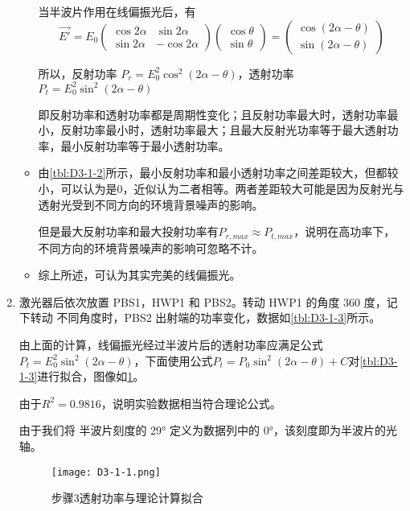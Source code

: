 \documentclass[dvipsnames, svgnames,a4paper,11pt]{article}
\begin{document}
\begin{enumerate}
\begin{itemize}
					当半波片作用在线偏振光后，有
					$$
						\vec{E'} = E_0 
						\begin{pmatrix}
							\cos2\alpha		&\sin2\alpha	\\
						   \sin2\alpha		&-\cos2\alpha
						\end{pmatrix}
						\begin{pmatrix}
							\cos\theta	\\
							\sin\theta
						\end{pmatrix} 
						= 
						\begin{pmatrix}
							\cos(2 \alpha - \theta)		\\
							\sin(2 \alpha - \theta)
						\end{pmatrix}
					$$

					所以，反射功率 $P_r = E_0^2 \cos^2(2 \alpha - \theta)$，透射功率 $P_t = E_0^2 \sin^2(2 \alpha - \theta)$

					即反射功率和透射功率都是周期性变化；且反射功率最大时，透射功率最小，反射功率最小时，透射功率最大；且最大反射光功率等于最大透射功率，最小反射功率等于最小透射功率。

					\item 由\cref{tbl:D3-1-2}所示，最小反射功率和最小透射功率之间差距较大，但都较小，可以认为是0，近似认为二者相等。两者差距较大可能是因为反射光与透射光受到不同方向的环境背景噪声的影响。
					
					但是最大反射功率和最大投射功率有$ P_{r,max} \approx P_{t,max} $，说明在高功率下，不同方向的环境背景噪声的影响可忽略不计。

					\item 综上所述，可认为其实完美的线偏振光。

				\end{itemize}

			
			\item 激光器后依次放置 PBS1，HWP1 和 PBS2。转动 HWP1 的角度 360 度，记下转动
			不同角度时，PBS2 出射端的功率变化，数据如\cref{tbl:D3-1-3}所示。

			由上面的计算，线偏振光经过半波片后的透射功率应满足公式 $P_t = E_0^2 \sin^2(2 \alpha - \theta)$，下面使用公式$ P_t = P_0 \sin^2(2\alpha - \theta) + C $对\cref{tbl:D3-1-3}进行拟合，图像如\cref{fig:D3-1-1}。

			由于$R^2 = 0.9816$，说明实验数据相当符合理论公式。

			由于我们将 半波片刻度的 29° 定义为数据列中的 0°，该刻度即为半波片的光轴。

			\begin{figure}[H]
				\centering
				\texttt{[image: D3-1-1.png]}
				\caption{步骤3透射功率与理论计算拟合}
				\label{fig:D3-1-1}
			\end{figure}




\end{enumerate}
\end{document}
